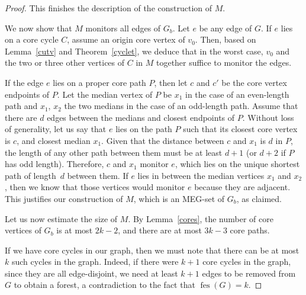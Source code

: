 \documentclass[10pt,a4paper]{amsart}
\theoremstyle{plain}
\theoremstyle{definition}
\DeclareMathOperator{\fes}{fes}
\begin{document}
\begin{proof}
This finishes the description of the construction of $M$.

\medskip

We now show that $M$ monitors all edges of $G_b$. Let $e$ be any edge of $G$. If $e$ lies on a core cycle $C$, assume an origin core vertex of $v_0$. Then, based on Lemma~\ref{cutv} and Theorem~\ref{cyclet}, we deduce that in the worst case, $v_0$ and the two or three other vertices of $C$ in $M$ together suffice to monitor the edges.

If the edge $e$ lies on a proper core path $P$, then let $c$ and $c'$ be the core vertex endpoints of $P$. Let the median vertex of $P$ be $x_1$ in the case of an even-length path and $x_1$, $x_2$ the two medians in the case of an odd-length path. Assume that there are $d$ edges between the medians and closest endpoints of $P$. Without loss of generality, let us say that $e$ lies on the path $P$ such that its closest core vertex is $c$, and closest median $x_1$. 
Given that the distance between $c$ and $x_1$ is $d$ in $P$, the length of any other path between them must be at least $d+1$ (or $d+2$ if $P$ has odd length). Therefore, $c$ and $x_1$ monitor $e$, which lies on the unique shortest path of length~$d$ between them. %
If $e$ lies in between the median vertices $x_1$ and $x_2$, then we know that those vertices would monitor $e$ because they are adjacent. %
This justifies our construction of $M$, which is an MEG-set of $G_b$, as claimed.

\medskip

Let us now estimate the size of $M$. By Lemma~\ref{cores}, the number of core vertices of $G_b$ is at most $2k-2$, and there are at most $3k-3$ core paths.

If we have core cycles in our graph, then we must note that there can be at most $k$ such cycles in the graph. Indeed, if there were $k+1$ core cycles in the graph, since they are all edge-disjoint, we need at least $k+1$ edges to be removed from $G$ to obtain a forest, a contradiction to the fact that $\fes(G)=k$.


\end{proof}
\end{document}
